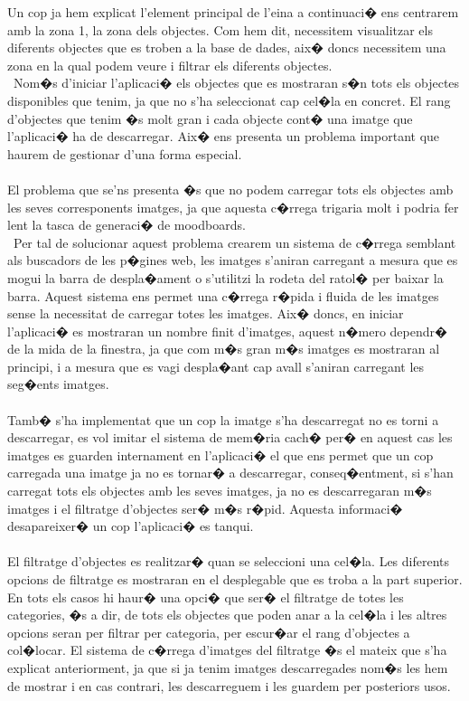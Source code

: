 \documentclass[12pt,a4paper,openright,oneside]{article}
\numberwithin{equation}{section}
\theoremstyle{definition}
\begin{document}
Un cop ja hem explicat l'element principal de l'eina a continuaci� ens centrarem amb la zona 1, la zona dels objectes. Com hem dit, necessitem visualitzar els diferents objectes que es troben a la base de dades, aix� doncs necessitem una zona en la qual podem veure i filtrar els diferents objectes. \\\
Nom�s d'iniciar l'aplicaci� els objectes que es mostraran s�n tots els objectes disponibles que tenim, ja que no s'ha seleccionat cap cel�la en concret. El rang d'objectes que tenim �s molt gran i cada objecte cont� una imatge que l'aplicaci� ha de descarregar. Aix� ens presenta un problema important que haurem de gestionar d'una forma especial.\\\\ El problema que se'ns presenta �s que no podem carregar tots els objectes amb les seves corresponents imatges, ja que aquesta c�rrega trigaria molt i podria fer lent la tasca de generaci� de moodboards. \\\
Per tal de solucionar aquest problema crearem un sistema de c�rrega semblant als buscadors de les p�gines web, les imatges s'aniran carregant a mesura que es mogui la barra de despla�ament o s'utilitzi la rodeta del ratol� per baixar la barra. Aquest sistema ens permet una c�rrega r�pida i fluida de les imatges sense la necessitat de carregar totes les imatges. Aix� doncs, en iniciar l'aplicaci� es mostraran un nombre finit d'imatges, aquest n�mero dependr� de la mida de la finestra, ja que com m�s gran m�s imatges es mostraran al principi, i a mesura que es vagi despla�ant cap avall s'aniran carregant les seg�ents imatges. \\\\
Tamb� s'ha implementat que un cop la imatge s'ha descarregat no es torni a descarregar, es vol imitar el sistema de mem�ria cach� per� en aquest cas les imatges es guarden internament en l'aplicaci� el que ens permet que un cop carregada una imatge ja no es tornar� a descarregar, conseq�entment, si s'han carregat tots els objectes amb les seves imatges, ja no es descarregaran m�s imatges i el filtratge d'objectes ser� m�s r�pid. Aquesta informaci� desapareixer� un cop l'aplicaci� es tanqui. \\\\
El filtratge d'objectes es realitzar� quan se seleccioni una cel�la. Les diferents opcions de filtratge es mostraran en el desplegable que es troba a la part superior. En tots els casos hi haur� una opci� que ser� el filtratge de totes les categories, �s a dir, de tots els objectes que poden anar a la cel�la i les altres opcions seran per filtrar per categoria, per escur�ar el rang d'objectes a col�locar. El sistema de c�rrega d'imatges del filtratge �s el mateix que s'ha explicat anteriorment, ja que si ja tenim imatges descarregades nom�s les hem de mostrar i en cas contrari, les descarreguem i les guardem per posteriors usos. \\\\
\end{document}

